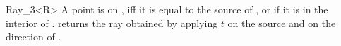 \begin{ccRefClass} {Ray_3<R>}
       {A point is on \ccVar, iff it is equal to the source 
        of \ccVar, or if it is in the interior of \ccVar.}
% 
% 
       {returns the ray obtained by applying $t$ on the source 
        and on the direction of \ccVar.}

\ccSeeAlso
{}

\end{ccRefClass} 
